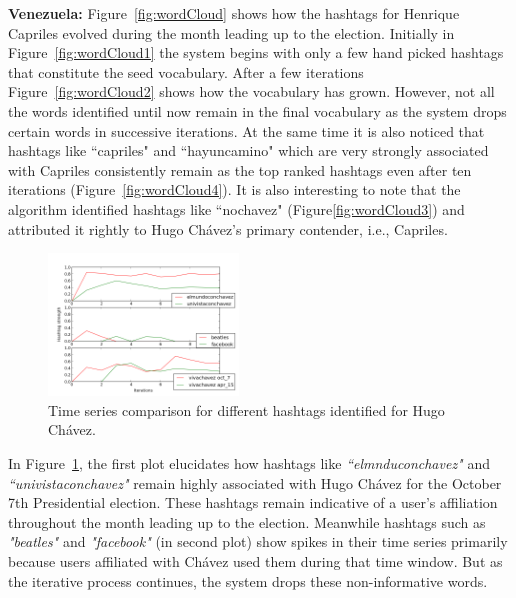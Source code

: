 \noindent
{\bf Venezuela:} %
Figure~\ref{fig:wordCloud} shows how the hashtags for Henrique Capriles evolved during the month leading up to the election.
Initially in Figure~\ref{fig:wordCloud1} the system begins with only a few hand picked hashtags that constitute the seed vocabulary. 
After a few iterations Figure~\ref{fig:wordCloud2} shows how the vocabulary has grown.
However, not all the words identified until now remain in the final vocabulary as the system drops certain words in successive iterations.
At the same time it is also noticed that hashtags like ``capriles" and ``hayuncamino" which are very strongly associated with Capriles consistently remain as the top ranked hashtags even after ten iterations (Figure~\ref{fig:wordCloud4}). 
It is also interesting to note that the algorithm identified hashtags like ``nochavez" (Figure\ref{fig:wordCloud3}) and attributed it rightly to Hugo Ch\'{a}vez's primary contender, i.e., Capriles. 
\begin{figure}[Ht]
	\centering
	\includegraphics[height=0.2\textheight, width=0.45\textwidth]{support_files/hashTagTimeSeries.png}
	\caption{Time series comparison for different hashtags identified for Hugo Ch\'{a}vez.}
	\label{fig:timeSeries}
\end{figure}
In Figure~\ref{fig:timeSeries}, the first plot elucidates how hashtags like \emph{``elmnduconchavez"} and 
\emph{``univistaconchavez"} remain highly associated with Hugo Ch\'{a}vez for the October 7th Presidential election. 
These hashtags remain indicative of a user's affiliation throughout the month leading up to the election.
Meanwhile hashtags such as \emph{"beatles"} and \emph{"facebook"} (in second plot) show spikes in their time series primarily because users affiliated with Ch\'{a}vez used them during that time window. 
But as the iterative process continues, the system drops these non-informative words.
